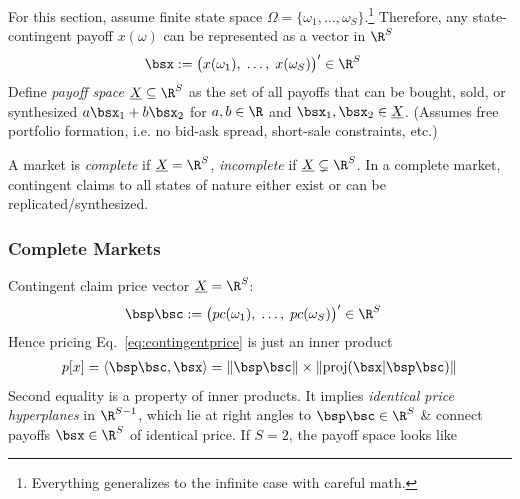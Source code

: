 \documentclass[12pt]{article}
\theoremstyle{plain}
\theoremstyle{definition}
\theoremstyle{remark}
\newcommand{\proj}{\operatorname{proj}}
\begin{document}
\begin{multicols*}{2}
For this section, assume finite state space
$\Omega=\{\omega_1,\ldots,\omega_S\}$.\footnote{%
  Everything generalizes to the infinite case with careful math.
}
Therefore, any state-contingent payoff $x(\omega)$ can be represented as
a vector in $\R^S$
\begin{align*}
  \bsx
  &:= \big(x(\omega_1),\; \ldots,\; x(\omega_S)\big)'
  \in\R^S
\end{align*}
Define \emph{payoff space} $\underline{X}\subseteq \R^S$ as the set of
all payoffs that can be bought, sold, or synthesized
$a\bsx_1 + b\bsx_2$ for $a,b\in\R$ and $\bsx_1,\bsx_2\in\underline{X}$.
(Assumes free portfolio formation, i.e. no bid-ask
spread, short-sale constraints, etc.)

A market is \emph{complete} if $\underline{X}=\R^S$, \emph{incomplete}
if $\underline{X}\subsetneq\R^S$. In a complete market, contingent
claims to all states of nature either exist or can be
replicated/synthesized.

\subsubsection{Complete Markets}

Contingent claim price vector $\underline{X}=\R^S$:
\begin{align*}
  \bsp\bsc
  &:= \big(pc(\omega_1),\; \ldots,\; pc(\omega_S)\big)'
  \in\R^S
\end{align*}
Hence pricing Eq.~\ref{eq:contingentprice} is just an inner product
\begin{align}
  p[x]=\langle \bsp\bsc, \bsx\rangle
  = \lVert \bsp\bsc\rVert \times \lVert \proj(\bsx|\bsp\bsc)\rVert
  \label{vectorprice}
\end{align}
Second equality is a property of inner products. It implies
\emph{identical price hyperplanes} in $\R^{S-1}$, which lie at right
angles to $\bsp\bsc\in\R^S$ \& connect payoffs $\bsx\in\R^S$ of
identical price.
If $S=2$, the payoff space looks like
\vspace{10pt}

\end{multicols*}
\end{document}

